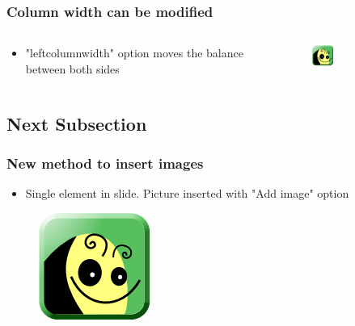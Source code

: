 \documentclass[usepdftitle=false,professionalfonts,compress ]{beamer}
\begin{document}
{
\begin{frame}\frametitle{Column width can be modified}
\begin{columns}
	\begin{column}{0.9\textwidth}
	\begin{itemize}

		\item "leftcolumnwidth" option moves the balance between both sides
	\end{itemize}
	\end{column}
	\begin{column}{0.27999999999999997\textwidth}

\begin{figure}
	\includegraphics[width=0.3\textwidth]{freeplane-logo-2014.png}\end{figure}\end{column}
\end{columns}

\end{frame}
}






\subsection{Next Subsection}

{
\begin{frame}\frametitle{New method to insert images}
	\begin{itemize}

		\item Single element in slide. Picture inserted with "Add image" option
	\end{itemize}

\begin{figure}
	\includegraphics[height=0.7\textheight]{freeplane-logo-2014.png}\end{figure}
\end{frame}
}
\end{document}
